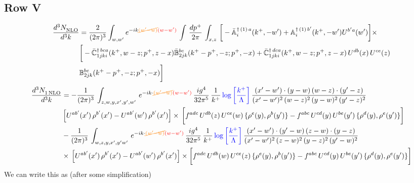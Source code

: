 \documentclass[9pt]{article}
\def\mf#1{\mathbb{#1}}
\numberwithin{equation}{section}
\begin{document}
\subsection{Row V}
\begin{align}
    \frac{d^{3}N_{\rm NLO}^{\rm}}{d^{3}k}  & = \frac{2}{(2\pi)^{3}}  \int_{w, w^\prime} e^{-ik{\color{orange}\cancel{(w^\prime-w)}}{\color{red}(w-w^\prime)}}\, \int\, \frac{dp^{+}}{2\pi}\,\int_{x,z}\, \bigg[-\bar{\mf{A}}^{\dagger\,(1)\,a}_{i}(k^{+},-w^{\prime})+\mf{A}^{\dagger\, (1)\, b^{\prime}}_{i}(k^{+},-w^{\prime})U^{b^{\prime}a}(w^{\prime})\bigg]\times\notag \\ & \bigg[-\Bar{\mf{C}}^{\dagger\, bca}_{1jki}(k^{+},w-z;p^{+},z-x)\Bar{\mf{B}}^{bc}_{2jk}(k^{+}-p^{+},- z;p^{+},-x)+\bar{\mf{C}}^{\dagger\, dca}_{1jki}(k^+,w-z; p^+, z-x)\,U^{db}(x)\,U^{ce}(z) \notag \\ & {\mf{B}}^{be}_{2jk} (k^{+}-p^+, -z; p^+, -x) \bigg]\nonumber
\end{align}
\begin{align}
     \frac{d^{3}N_{1\,\rm NLO}^{\rm}}{d^{3}k}  & =  -\frac{1}{(2\pi)^{3}}\, \int_{z,w,y,x',y',w'}\,e^{-ik\cdot {\color{orange}\cancel{(w^\prime-w)}}{\color{red}(w-w^\prime)}}\,\frac{ig^{4}}{32\pi^{5}}\, \frac{1}{k^{+}}\,{\color{blue}\log{\left[\frac{k^{+}}{\Lambda}\right]}}\,\frac{(x'-w')\cdot (y-w)\,(w-z)\cdot (y'-z)}{(x'-w')^{2}\,(w-z)^{2}\,(y-w)^{2}\,(y'-z)^{2}}\,\notag \\ & \left[U^{ab'}(x')\,\rho^{b'}(x')-U^{ab'}(w')\,\rho^{b'}(x')\right]\times\, \bigg[f^{adc}\,U^{db}(z)\,U^{ce}(w)\, \{\rho^{e}(y),\rho^{b}(y')\}-f^{abc}\,U^{cd}(y)\,U^{be}(y')\, \{\rho^{d}(y),\rho^{e}(y')\}\bigg]\notag \\ &  -\frac{1}{(2\pi)^{3}}\, \int_{w,z,y,x',y'w'}\,e^{-ik\cdot {\color{orange}\cancel{(w^\prime-w)}}{\color{red}(w-w^\prime)}}\,\frac{ig^{4}}{32\pi^{5}}\, \frac{1}{k^{+}}\,{\color{blue}\log{\left[\frac{k^{+}}{\Lambda}\right]}}\,\frac{(x'-w')\cdot (y'-w)\,(z-w)\cdot (y-z)}{(x'-w')^{2}\,(z-w)^{2}\,(y-z)^{2}\,(y'-w)^{2}}\notag \\ & \times\, \left[U^{ab'}(x')\,\rho^{b'}(x')-U^{ab'}(w')\,\rho^{b'}(x')\right]\times \bigg[f^{adc}\,U^{db}(w)\,U^{ce}(z)\, \{\rho^{e}(y),\rho^{b}(y')\}-f^{abc}\,U^{cd}(y)\,U^{be}(y')\, \{\rho^{d}(y),\rho^{e}(y')\}\bigg]
\end{align}
We can write this as (after some simplification)
\end{document}
